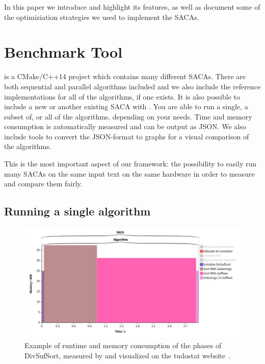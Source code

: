 In this paper we introduce \sacabench and highlight its features,
as well as document some of the optimiziation strategies we used to implement the SACAs.

\section{Benchmark Tool}

\sacabench is a CMake/C++14 project which contains many different SACAs.
There are both sequential and parallel algorithms included
and we also include the reference implementations for all of the algorithms, if one exists.
It is also possible to include a new or another existing SACA with \sacabench.
You are able to run a single, a subset of, or all of the algorithms, depending on your needs.
Time and memory consumption is automatically measured and can be output as JSON.
We also include tools to convert the JSON-format to graphs for a visual comparison of the algorithms.

This is the most important aspect of our framework:
the possibility to easily run many SACAs on the same input text on the same hardware
in order to measure and compare them fairly.
\subsection{Running a single algorithm}

\begin{figure}[!h]
    \centering
    \includegraphics[width=\textwidth]{kapitel/1_extended_abstract/tudostat_example.png}
    \caption{Example of runtime and memory consumption of the phases of DivSufSort, measured by \sacabench and visualized on the tudostat website~\cite{tudostat}.}
    \label{ea:phases}
\end{figure}

